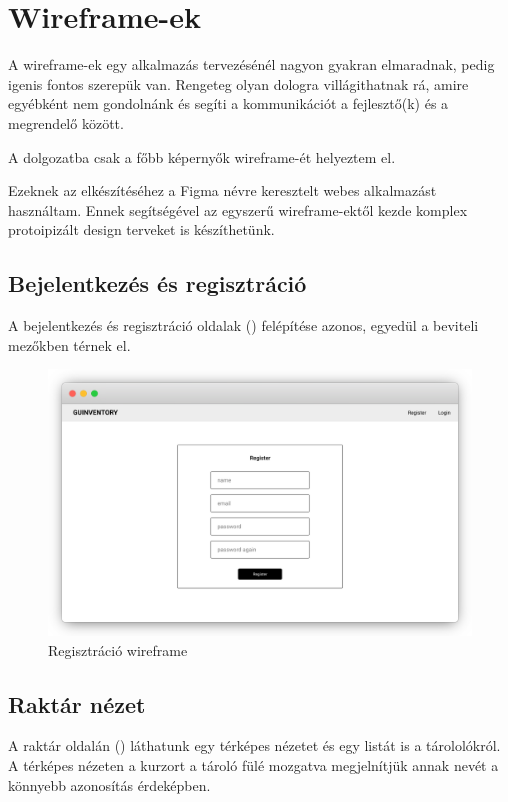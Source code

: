 \chapter{Wireframe-ek}

A wireframe-ek egy alkalmazás tervezésénél nagyon gyakran elmaradnak, pedig igenis fontos szerepük van.
Rengeteg olyan dologra villágithatnak rá, amire egyébként nem gondolnánk és segíti a kommunikációt a fejlesztő(k) és a megrendelő között.

A dolgozatba csak a főbb képernyők wireframe-ét helyeztem el.

Ezeknek az elkészítéséhez a Figma névre keresztelt webes alkalmazást használtam. 
Ennek segítségével az egyszerű wireframe-ektől kezde komplex protoipizált design terveket is készíthetünk.

\section{Bejelentkezés és regisztráció}
A bejelentkezés és regisztráció oldalak () felépítése azonos, egyedül a beviteli mezőkben térnek el.
\begin{figure}[!ht]
  \centering
  \includegraphics[width=150mm, keepaspectratio]{figures/wireframes/frame_registration.png}
  \caption{Regisztráció wireframe}
  \label{fig:RegistrationWireframe}
\end{figure}


\section{Raktár nézet}
A raktár oldalán () láthatunk egy térképes nézetet és egy listát is a tárololókról. 
A térképes nézeten a kurzort a tároló fülé mozgatva megjelnítjük annak nevét a könnyebb azonosítás érdeképben.

